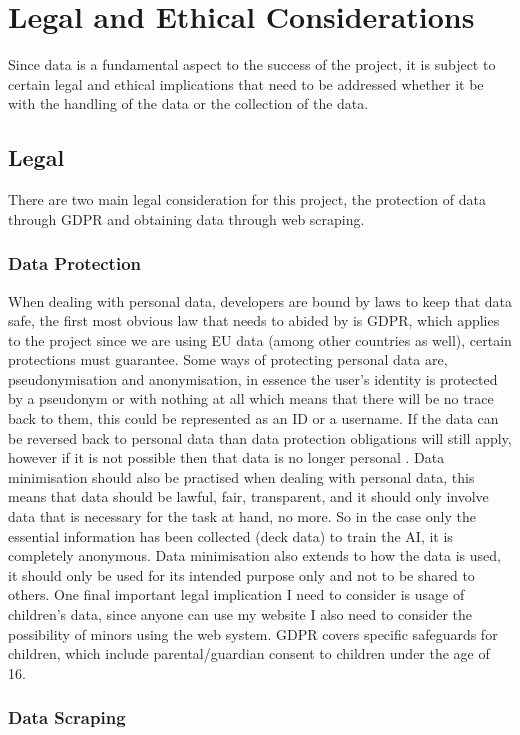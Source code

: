 \documentclass{report} %
\begin{document}
\chapter{Legal and Ethical Considerations}
Since data is a fundamental aspect to the success of the project, it is subject to certain legal and ethical implications that need to be addressed whether it be with the handling of the data or the collection of the data.
\section{Legal}
There are two main legal consideration for this project, the protection of data through GDPR and obtaining data through web scraping.
\subsection{Data Protection}
When dealing with personal data, developers are bound by laws to keep that data safe, the first most obvious law that needs to abided by is GDPR, which applies to the project since we are using EU data (among other countries as well), certain protections must guarantee. Some ways of protecting personal data are, pseudonymisation and anonymisation, in essence the user’s identity is protected by a pseudonym or with nothing at all which means that there will be no trace back to them, this could be represented as an ID or a username. If the data can be reversed back to personal data than data protection obligations will still apply, however if it is not possible then that data is no longer personal \cite{Euro2018}. Data minimisation should also be practised when dealing with personal data, this means that data should be lawful, fair, transparent, and it should only involve data that is necessary for the task at hand, no more. So in the case only the essential information has been collected (deck data) to train the AI, it is completely anonymous. Data minimisation also extends to how the data is used, it should only be used for its intended purpose only and not to be shared to others. One final important legal implication I need to consider is usage of children's data, since anyone can use my website I also need to consider the possibility of minors using the web system. GDPR covers specific safeguards for children, which include parental/guardian consent to children under the age of 16.

\subsection{Data Scraping}
\end{document}
